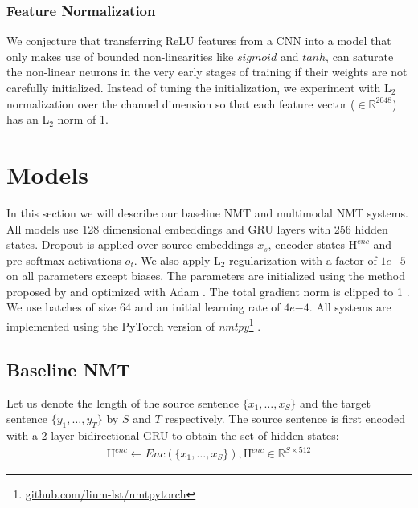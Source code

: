 \documentclass[11pt,a4paper]{article}
\newcommand{\ti}[1] {\textit{#1}}
\begin{document}
\subsubsection {Feature Normalization}
We conjecture that transferring ReLU features from a CNN into a model
that only makes use of bounded non-linearities like $sigmoid$ and $tanh$, can saturate the non-linear neurons
in the very early stages of training if their weights are not carefully initialized.
Instead of tuning the initialization, we experiment with L$_2$ normalization over the channel dimension
so that each feature vector ($\in \mathbb{R}^{2048}$) has an L$_2$ norm of 1.

\section{Models}
\label{sec:models}
In this section we will describe our baseline NMT and multimodal NMT systems.
All models use 128 dimensional embeddings and GRU \cite{cho2014gru} layers with 256 hidden states. Dropout \cite{srivastava2014dropout} is applied over source embeddings $x_s$, encoder states $\mathrm{H}^{enc}$ and pre-softmax activations $o_t$. We also apply L$_2$ regularization with a factor of $1e\mathrm{-}5$
on all parameters except biases. The parameters are initialized using the method proposed by  and optimized with Adam \cite{kingma2014adam}. The total gradient norm is clipped to 1 \cite{pascanu2013difficulty}. We use batches of size 64 and an initial learning rate of $4e\mathrm{-}4$.
All systems are implemented using the PyTorch version of \ti{nmtpy}\footnote{\url{github.com/lium-lst/nmtpytorch}} \cite{nmtpy}.

\subsection{Baseline NMT}
Let us denote the length of the source sentence $\{x_1, \dotsc , x_S\}$ and the target sentence $\{y_1, \dotsc , y_T\}$ by $S$ and $T$ respectively.
The source sentence is first encoded with a 2-layer bidirectional GRU to obtain the set of hidden states:
\begin{align*}
  \mathrm{H}^{enc} \leftarrow Enc(\{x_1, \dotsc , x_S\}), \mathrm{H}^{enc} \in \mathbb{R}^{S\times 512}
\end{align*}
\end{document}
